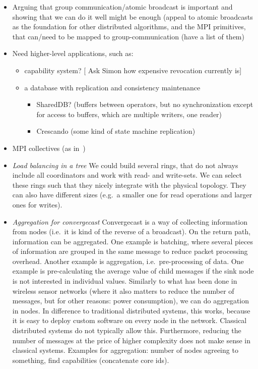 \documentclass{article}
\newcommand{\stefan}[1]{
  {\color{skRed}[{\color{red}{SK}} #1]}}
\begin{document}
\begin{itemize}
\item Arguing that group communication/atomic broadcast is important
  and showing that we can do it well might be enough (appeal to atomic
  broadcasts as the foundation for other distributed algorithms, and
  the MPI primitives, that can/need to be mapped to
  group-communication (have a list of them)
\item Need higher-level applications, such as:
  \begin{itemize}
  \item capability system? \stefan{Ask Simon how expensive revocation
      currently is}
  \item a database with replication and consistency maintenance
    \begin{itemize}
    \item SharedDB? (buffers between operators, but no synchronization
      except for access to buffers, which are multiple writers, one
      reader)
    \item Crescando (some kind of state machine replication)
    \end{itemize}
  \end{itemize}
\item MPI collectives (as in~\cite{Tu2008})
\item \emph{Load balancing in a tree} We could build several rings,
  that do not always include all coordinators and work with read- and
  write-sets. We can select these rings such that they nicely
  integrate with the physical topology. They can also have different
  sizes (e.g.\ a smaller one for read operations and larger ones for
  writes).
\item \emph{Aggregation for convergecast} %
  Convergecast is a way of collecting information from nodes (i.e.\ it
  is kind of the reverse of a broadcast). On the return path,
  information can be aggregated. One example is batching, where several
  pieces of information are grouped in the same message to reduce packet
  processing overhead. Another example is aggregation, i.e.\
  pre-processing of data. One example is pre-calculating the average
  value of child messages if the sink node is not interested in
  individual values. %
  Similarly to what has been done in wireless sensor networks (where it
  also matters to reduce the number of messages, but for other reasons:
  power consumption), we can do aggregation in nodes. In difference to
  traditional distributed systems, this works, because it is easy to
  deploy custom software on every node in the network. Classical
  distributed systems do not typically allow this. Furthermore, reducing
  the number of messages at the price of higher complexity does not make
  sense in classical systems. %
  Examples for aggregation: number of nodes agreeing to something, find
  capabilities (concatenate core ids). 
\end{itemize}
\end{document}
